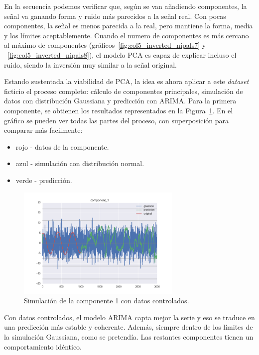 \documentclass[11pt,spanish,listoffigures,listoftables]{tfgetsinf}
\begin{document}
        En la secuencia podemos verificar que, según se van añadiendo componentes, la señal va ganando forma y ruido más parecidos a la señal real. Con pocas componentes, la señal es menos parecida a la real, pero mantiene la forma, media y los límites aceptablemente. Cuando el numero de componentes es más cercano al máximo de componentes (gráficos~\ref{fig:col5_inverted_nipals7} y ~\ref{fig:col5_inverted_nipals8}), el modelo PCA es capaz de explicar incluso el ruido, siendo la inversión muy similar a la señal original. 
        
        Estando sustentada la viabilidad de PCA, la idea es ahora aplicar a este {\em dataset} ficticio el proceso completo: cálculo de componentes principales, simulación de datos con distribución Gaussiana y predicción con ARIMA. Para la primera componente, se obtienen los resultados representados en la Figura~\ref{fig:component_1}. En el gráfico se pueden ver todas las partes del proceso, con superposición para comparar más facilmente:
	\begin{itemize}
            \item rojo - datos de la componente.
            \item azul - simulación con distribución normal.
            \item verde - predicción.
	\end{itemize}
	
        \begin{figure}[H]
            \centering
            \includegraphics[width=0.7\textwidth]{simulated_data_8_columns/component_1.png}
            \caption{Simulación de la componente 1 con datos controlados.}
            \label{fig:component_1}
        \end{figure}
        
        Con datos controlados, el modelo ARIMA capta mejor la serie y eso se traduce en una predicción más estable y coherente. Además, siempre dentro de los límites de la simulación Gaussiana, como se pretendía. Las restantes componentes tienen un comportamiento idéntico.
        
\end{document}
